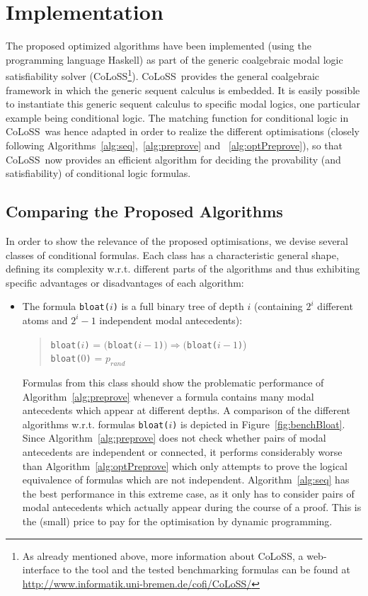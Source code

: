 \documentclass{entcs} \usepackage{entcsmacro}
\newcommand{\COLOSS}{{\textrm CoLoSS}}
\begin{document}
\section{Implementation}

The proposed optimized algorithms have been implemented (using the programming
language Haskell) as part of the generic coalgebraic modal logic satisfiability
solver (\COLOSS\footnote{As already mentioned above, more information about \COLOSS,
a web-interface to the tool and 
the tested benchmarking formulas can be found at \url{http://www.informatik.uni-bremen.de/cofi/CoLoSS/}}).
\COLOSS~provides the general coalgebraic framework in which the generic
sequent calculus is embedded. It is easily possible to instantiate this generic sequent
calculus to specific modal logics, one particular example being conditional logic.
The matching function for conditional logic in \COLOSS~was hence adapted in order to realize
the different optimisations (closely following Algorithms~\ref{alg:seq},~\ref{alg:preprove} and
~\ref{alg:optPreprove}), so that \COLOSS~now provides an efficient algorithm for
deciding the provability (and satisfiability) of conditional logic formulas.

\subsection{Comparing the Proposed Algorithms}
\label{sec:bench}

In order to show the relevance of the proposed optimisations, we devise several classes
of conditional formulas. Each class has a characteristic general shape, defining its
complexity w.r.t. different parts of the algorithms and thus exhibiting specific
advantages or disadvantages of each algorithm:

\begin{itemize}
\item The formula \verb|bloat(|$i$\verb|)| is a full binary tree of depth $i$ (containing $2^i$ different atoms
and $2^i-1$ independent modal antecedents):
\begin{quote}
\verb|bloat(|$i$\verb|)| = $($\verb|bloat(|$i-1$\verb|)|$)\Rightarrow($\verb|bloat(|$i-1$\verb|)|)\\
\verb|bloat(|$0$\verb|)| = $p_{rand}$
\end{quote}
Formulas from this class should show the problematic performance of Algorithm~\ref{alg:preprove} whenever
a formula contains many modal antecedents which appear at different depths. A comparison of the different
algorithms w.r.t. formulas \verb|bloat(|$i$\verb|)| is depicted in Figure~\ref{fig:benchBloat}.
Since Algorithm~\ref{alg:preprove} does not check whether pairs of modal antecedents are independent or connected,
it performs considerably worse than Algorithm~\ref{alg:optPreprove} which only attempts to prove the logical
equivalence of formulas which are not independent. Algorithm~\ref{alg:seq} has the best performance in this
extreme case, as it only has to consider pairs of modal antecedents which actually appear during the course
of a proof. This is the (small) price to pay for the optimisation by dynamic programming.
\end{itemize}
\end{document}
